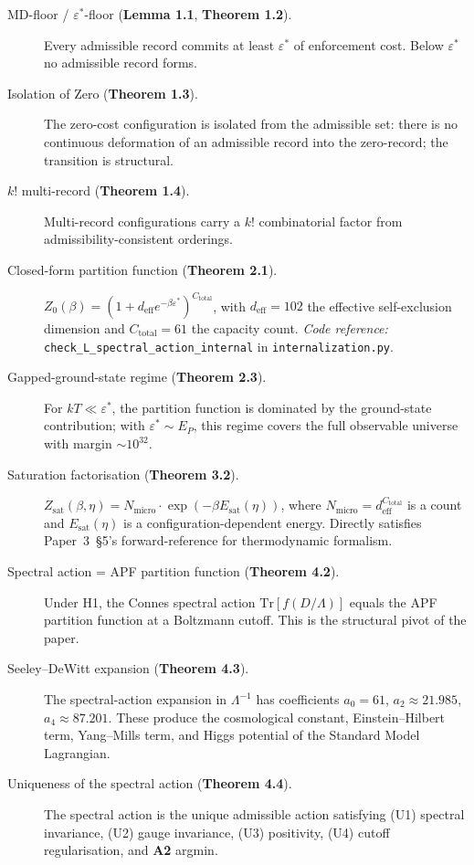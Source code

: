 \documentclass[11pt]{article}
\newcommand{\coderef}[2]{\smallskip\noindent\textit{Code reference:} \texttt{#1} in \texttt{#2}.}
\begin{document}
\begin{description}
    \item[MD-floor / $\varepsilon^*$-floor (\textbf{Lemma 1.1}, \textbf{Theorem 1.2}).] Every admissible record commits at least $\varepsilon^*$ of enforcement cost. Below $\varepsilon^*$ no admissible record forms.
    \item[Isolation of Zero (\textbf{Theorem 1.3}).] The zero-cost configuration is isolated from the admissible set: there is no continuous deformation of an admissible record into the zero-record; the transition is structural.
    \item[$k!$ multi-record (\textbf{Theorem 1.4}).] Multi-record configurations carry a $k!$ combinatorial factor from admissibility-consistent orderings.
    \item[Closed-form partition function (\textbf{Theorem 2.1}).] $Z_0(\beta) = (1 + d_{\mathrm{eff}} e^{-\beta \varepsilon^*})^{C_{\mathrm{total}}}$, with $d_{\mathrm{eff}} = 102$ the effective self-exclusion dimension and $C_{\mathrm{total}} = 61$ the capacity count. \coderef{check\_L\_spectral\_action\_internal}{internalization.py}
    \item[Gapped-ground-state regime (\textbf{Theorem 2.3}).] For $kT \ll \varepsilon^*$, the partition function is dominated by the ground-state contribution; with $\varepsilon^* \sim E_P$, this regime covers the full observable universe with margin $\sim 10^{32}$.
    \item[Saturation factorisation (\textbf{Theorem 3.2}).] $Z_{\mathrm{sat}}(\beta, \eta) = N_{\mathrm{micro}} \cdot \exp(-\beta E_{\mathrm{sat}}(\eta))$, where $N_{\mathrm{micro}} = d_{\mathrm{eff}}^{C_{\mathrm{total}}}$ is a count and $E_{\mathrm{sat}}(\eta)$ is a configuration-dependent energy. Directly satisfies Paper~3~\S5's forward-reference for thermodynamic formalism.
    \item[Spectral action = APF partition function (\textbf{Theorem 4.2}).] Under H1, the Connes spectral action $\mathrm{Tr}[f(D/\Lambda)]$ equals the APF partition function at a Boltzmann cutoff. This is the structural pivot of the paper.
    \item[Seeley--DeWitt expansion (\textbf{Theorem 4.3}).] The spectral-action expansion in $\Lambda^{-1}$ has coefficients $a_0 = 61$, $a_2 \approx 21.985$, $a_4 \approx 87.201$. These produce the cosmological constant, Einstein--Hilbert term, Yang--Mills term, and Higgs potential of the Standard Model Lagrangian.
    \item[Uniqueness of the spectral action (\textbf{Theorem 4.4}).] The spectral action is the unique admissible action satisfying (U1) spectral invariance, (U2) gauge invariance, (U3) positivity, (U4) cutoff regularisation, and \textbf{A2} argmin.

\end{description}
\end{document}
